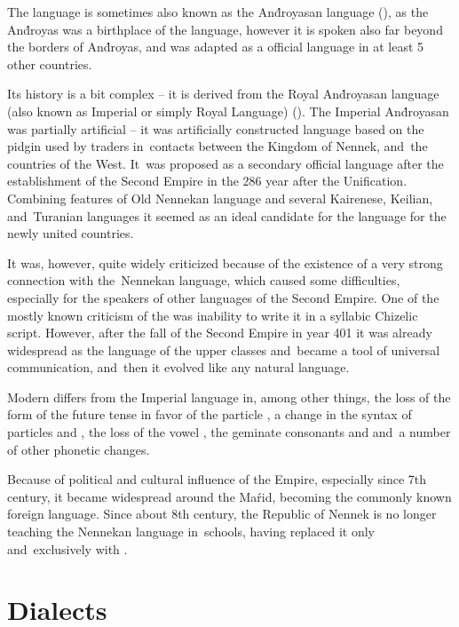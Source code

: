 The language \andro is sometimes also known as the And́royasan language
(), as the And́royas was a
birthplace of the language, however it is spoken also far beyond the borders of
And́royas, and was adapted as a official language in at least 5 other countries.

Its history is a bit complex -- it is derived from the Royal And́royasan
language (also known as Imperial or simply Royal Language) (). The Imperial And́royasan was partially artificial -- it
was artificially constructed language based on the pidgin used by traders
in~contacts between the Kingdom of Nennek, and~the countries of the West. It~was
proposed as a secondary official language after the establishment of the Second
Empire in the 286 year after the Unification. Combining features of Old Nennekan
language and several Kairenese, Keilian, and~Turanian languages it seemed as an
ideal candidate for the language for the newly united countries.

It was, however, quite widely criticized because of the existence of a very
strong connection with the~Nennekan language, which caused some difficulties,
especially for the speakers of other languages of the Second Empire. One of the
mostly known criticism of the  was inability to write it in
a syllabic Chizelic script. However, after the fall of the Second Empire in year
401 it was already widespread as the language of the upper classes and~became a
tool of universal communication, and~then it evolved like any natural language.

Modern \andro differs from the Imperial language in, among other things, the
loss of the form of the future tense in favor of the particle , a
change in the syntax of particles  and , the loss of the
vowel , the geminate consonants  and  and~a number of other
phonetic changes.

Because of political and cultural influence of the Empire, especially since 7th
century, it became widespread around the Maŕid, becoming the commonly known
foreign language. Since about 8th century, the Republic of Nennek is no longer
teaching the Nennekan language in~schools, having replaced it only
and~exclusively with \andro.

\section{Dialects}

